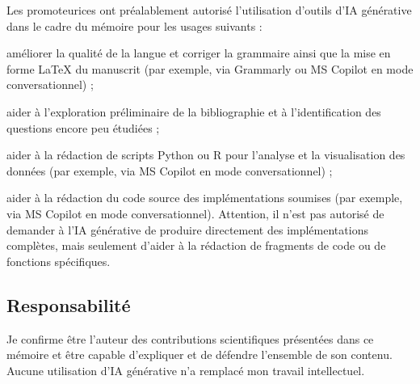 Les promoteurices ont préalablement autorisé l’utilisation d’outils d’IA générative dans le cadre du mémoire pour les usages suivants :
\begin{compactenum}
    \item améliorer la qualité de la langue et corriger la grammaire ainsi que la mise en forme LaTeX du manuscrit (par exemple, via Grammarly ou MS Copilot en mode conversationnel) ;
    \item aider à l'exploration préliminaire de la bibliographie et à l'identification des questions encore peu étudiées ;
    \item aider à la rédaction de scripts Python ou R pour l’analyse et la visualisation des données (par exemple, via MS Copilot en mode conversationnel) ;
    \item aider à la rédaction du code source des implémentations soumises (par exemple, via MS Copilot en mode conversationnel). Attention, il n'est pas autorisé de demander à l'IA générative de produire directement des implémentations complètes, mais seulement d'aider à la rédaction de fragments de code ou de fonctions spécifiques.
\end{compactenum}

\subsection*{Responsabilité}

Je confirme être l’auteur des contributions scientifiques présentées dans ce mémoire et être capable d’expliquer et de défendre l’ensemble de son contenu. Aucune utilisation d’IA générative n’a remplacé mon travail intellectuel.